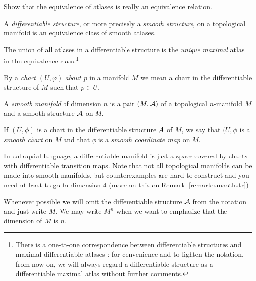 \begin{exercise}
	Show that the equivalence of atlases is really an equivalence relation.
\end{exercise}

\begin{definition}\label{def:diffstr}
	A \emph{differentiable structure}, or more precisely a \emph{smooth structure}, on a topological manifold is an equivalence class of smooth atlases.
\end{definition}

\begin{remark}
	The union of all atlases in a differentiable structure is the \emph{unique} \emph{maximal} atlas in the equivalence class.\footnote{There is a one-to-one correspondence between differentiable structures and maximal differentiable atlases \cite[Proposition 1.17]{book:lee}: for convenience and to lighten the notation, from now on, we will always regard a differentiable structure as a differentiable maximal atlas without further comments.}
\end{remark}

\begin{notation}
	By a \emph{chart $(U, \varphi)$ about $p$} in a manifold $M$ we mean a chart in the differentiable structure of $M$ such that $p\in U$.
\end{notation}

\begin{definition}\label{def:diffmanifold}
	A \emph{smooth manifold} of dimension $n$ is a pair $(M, \mathcal{A})$ of a topological $n$-manifold $M$ and a smooth structure $\mathcal{A}$ on $M$.

	If $(U, \phi)$ is a chart in the differentiable structure $\mathcal{A}$ of $M$, we say that $(U, \phi$ is a \emph{smooth chart} on $M$ and that $\phi$ is a \emph{smooth coordinate map} on $M$.
\end{definition}

In colloquial language, a differentiable manifold is just a space covered by charts with differentiable transition maps.
Note that not all topological manifolds can be made into smooth manifolds, but counterexamples are hard to construct and you need at least to go to dimension 4 (more on this on Remark~\ref{remark:smoothstr}).

\begin{notation}
	Whenever possible we will omit the differentiable structure $\mathcal{A}$ from the notation and just write $M$.
	We may write $M^n$ when we want to emphasize that the dimension of $M$ is $n$.
\end{notation}

